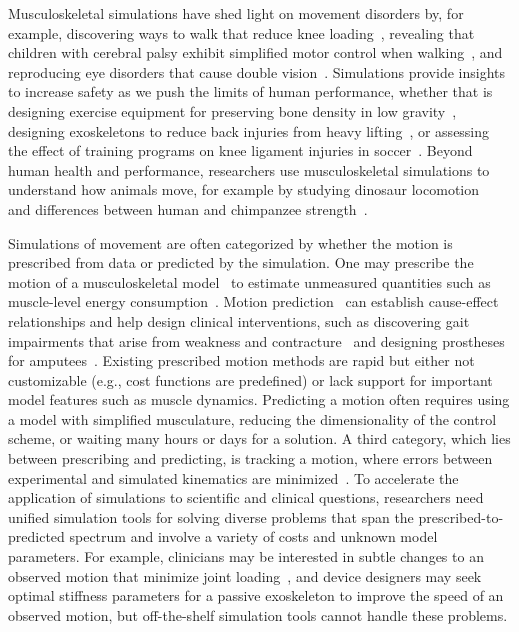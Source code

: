 \documentclass[10pt,letterpaper]{article}
\begin{document}
Musculoskeletal simulations have shed light on movement disorders by, for example, discovering ways to walk that reduce knee loading~\cite{Fregly:2007ac}, revealing that children with cerebral palsy exhibit simplified motor control when walking~\cite{Steele:2015}, and reproducing eye disorders that cause double vision~\cite{Priamikov:2016}. Simulations provide insights to increase safety as we push the limits of human performance, whether that is designing exercise equipment for preserving bone density in low gravity~\cite{Fregly:2015}, designing exoskeletons to reduce back injuries from heavy lifting~\cite{Manns:2016}, or assessing the effect of training programs on knee ligament injuries in soccer~\cite{Thompson:2017}. Beyond human health and performance, researchers use musculoskeletal simulations to understand how animals move, for example by studying dinosaur locomotion~\cite{sthaya:2005uk} and differences between human and chimpanzee strength~\cite{ONeill:2017}.

Simulations of movement are often categorized by whether the motion is prescribed from data or predicted by the simulation. One may prescribe the motion of a musculoskeletal model~\cite{Thelen:2003bba,Lloyd:2003} to estimate unmeasured quantities such as muscle-level energy consumption~\cite{Farris:2014du,Jackson:2017go}. Motion prediction~\cite{Geijtenbeek:2019} can establish cause-effect relationships and help design clinical interventions, such as discovering gait impairments that arise from weakness and contracture~\cite{Ong:2019a} and designing prostheses for amputees~\cite{Handford:2016kd}. Existing prescribed motion methods are rapid but either not customizable (e.g., cost functions are predefined) or lack support for important model features such as muscle dynamics. Predicting a motion often requires using a model with simplified musculature, reducing the dimensionality of the control scheme, or waiting many hours or days for a solution. A third category, which lies between prescribing and predicting, is tracking a motion, where errors between experimental and simulated kinematics are minimized~\cite{Lin:2017jp}. To accelerate the application of simulations to scientific and clinical questions, researchers need unified simulation tools for solving diverse problems that span the prescribed-to-predicted spectrum and involve a variety of costs and unknown model parameters. For example, clinicians may be interested in subtle changes to an observed motion that minimize joint loading~\cite{Fregly:2007ac}, and device designers may seek optimal stiffness parameters for a passive exoskeleton to improve the speed of an observed motion, but off-the-shelf simulation tools cannot handle these problems.
\end{document}
